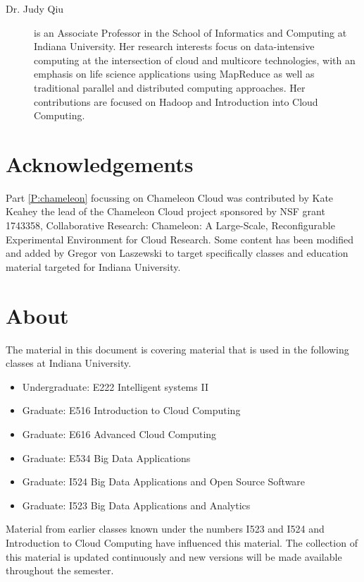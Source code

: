 \begin{enumerate}
\begin{description}
\item [Dr. Judy Qiu] is an Associate Professor in the School of
  Informatics and Computing at Indiana University. Her research
  interests focus on data-intensive computing at the intersection of
  cloud and multicore technologies, with an emphasis on life science
  applications using MapReduce as well as traditional parallel and
  distributed computing approaches. Her contributions are focused on
  Hadoop and Introduction into Cloud Computing. 

\end{description}

\section{Acknowledgements}

Part \ref{P:chameleon} focussing on Chameleon Cloud was contributed by
Kate Keahey the lead of the Chameleon Cloud project sponsored by NSF
grant 1743358, Collaborative Research: Chameleon: A Large-Scale,
Reconfigurable Experimental Environment for Cloud Research. Some
content has been modified and added by Gregor von Laszewski to target
specifically classes and education material targeted for Indiana
University.

\section{About}

The material in this document is covering material that is used in the
following classes at Indiana University.

\begin{itemize}
\item Undergraduate: E222 Intelligent systems II
\item Graduate: E516 Introduction to Cloud Computing
\item Graduate: E616 Advanced Cloud Computing
\item Graduate: E534 Big Data Applications
\item Graduate: I524 Big Data Applications and Open Source Software
\item Graduate: I523 Big Data Applications and Analytics
\end{itemize}

Material from earlier classes known under the numbers I523 and I524
and Introduction to Cloud Computing have influenced this material. The
collection of this material is updated continuously and new versions
will be made available throughout the semester.


\end{enumerate}

